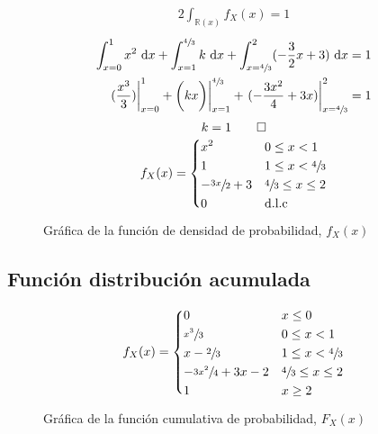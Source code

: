 \documentclass[paper=letterpaper]{article}
\begin{document}
\begin{alignat}{2}
\int_{\mathbb{R}(x)} f_{X}(x) = 1
\end{alignat}
\begin{alignat*}{2}
\int_{x = 0}^{1} x^2 ~\text{d}x  + \int_{x = 1}^{\sfrac{4}{3}} k ~\text{d}x + \int_{x = \sfrac{4}{3}}^{2} (-\frac{3}{2}x + 3) ~\text{d}x &= 1 \\
\left.(\frac{x^3}{3})\right|_{x = 0}^1 + \bigg(kx\bigg)\bigg|_{x = 1}^{\sfrac{4}{3}} + \left.(-\frac{3x^2}{4} + 3x)\right|_{x = \sfrac{4}{3}}^2  &= 1 \\
\end{alignat*}
\begin{equation*}
k = 1 \qed
\end{equation*}
\begin{equation*}
f_{X}(x) =  
\begin{dcases}
   x^2 & 0 \leq x < 1 \\
   1  & 1 \leq x < \sfrac{4}{3} \\
   -\sfrac{3x}{2} + 3 &  \sfrac{4}{3} \leq x \leq 2 \\
   0 & \text{d.l.c}
\end{dcases}
\end{equation*}

\begin{figure}[!htbp]
\centering
{}
\caption{Gráfica de la función de densidad de probabilidad, $f_X(x)$}
\label{Fig:F6}
\end{figure}



\subsection{Funci\'{o}n distribuci\'{o}n acumulada}
\begin{equation*}
f_{X}(x) =  
\begin{dcases}
   0   & x \leq 0 \\
   \sfrac{x^3}{3} & 0 \leq x < 1 \\
   x - \sfrac{2}{3}  & 1 \leq x < \sfrac{4}{3} \\
   -\sfrac{3x^2}{4} + 3x - 2 &  \sfrac{4}{3} \leq x \leq 2 \\
   1 & x \geq 2
\end{dcases}
\end{equation*}

\begin{figure}[!htbp]
\centering
{}
\caption{Gráfica de la función cumulativa de probabilidad, $F_X(x)$}
\label{Fig:F6}
\end{figure}
\end{document}
